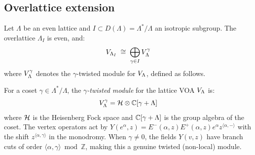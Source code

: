 \subsection{Overlattice extension}

\begin{theorem}\label{thm:lattice:overlattice}
Let $\Lambda$ be an even lattice and $I \subset D(\Lambda) = \Lambda^*/\Lambda$
an isotropic subgroup. The overlattice $\Lambda_I$ is even, and:
\begin{equation}\label{eq:lattice:overlattice}
V_{\Lambda_I}
\;\cong\; \bigoplus_{\gamma \in I} V_\Lambda^\gamma
\end{equation}
where $V_\Lambda^\gamma$ denotes the $\gamma$-twisted module
for $V_\Lambda$, defined as follows.

\begin{definition}\label{def:twisted-module-lattice}
For a coset $\gamma \in \Lambda^*/\Lambda$, the \emph{$\gamma$-twisted module} for the lattice VOA $V_\Lambda$ is:
\[
V_\Lambda^\gamma = \mathcal{H} \otimes \mathbb{C}[\gamma + \Lambda]
\]
where $\mathcal{H}$ is the Heisenberg Fock space and $\mathbb{C}[\gamma + \Lambda]$ is the group algebra of the coset.  The vertex operators act by $Y(e^\alpha, z) = E^-(\alpha, z) E^+(\alpha, z) e^\alpha z^{\langle \alpha, - \rangle}$ with the shift $z^{\langle \alpha, \gamma \rangle}$ in the monodromy.  When $\gamma \neq 0$, the fields $Y(v, z)$ have branch cuts of order $\langle \alpha, \gamma \rangle \bmod \mathbb{Z}$, making this a genuine twisted (non-local) module.
\end{definition}
\end{theorem}

